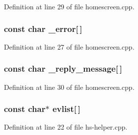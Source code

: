 Definition at line 29 of file homescreen.\+cpp.

\subsubsection[{\texorpdfstring{\+\_\+error}{_error}}]{\setlength{\rightskip}{0pt plus 5cm}const char \+\_\+error\mbox{[}$\,$\mbox{]}}\hypertarget{hs-helper_8h_aed1c5296a2e6d34945507a0fca17a376}{}\label{hs-helper_8h_aed1c5296a2e6d34945507a0fca17a376}


Definition at line 27 of file homescreen.\+cpp.

\subsubsection[{\texorpdfstring{\+\_\+reply\+\_\+message}{_reply_message}}]{\setlength{\rightskip}{0pt plus 5cm}const char \+\_\+reply\+\_\+message\mbox{[}$\,$\mbox{]}}\hypertarget{hs-helper_8h_a79b0f0b481161527ccb80e83da143219}{}\label{hs-helper_8h_a79b0f0b481161527ccb80e83da143219}


Definition at line 30 of file homescreen.\+cpp.

\subsubsection[{\texorpdfstring{evlist}{evlist}}]{\setlength{\rightskip}{0pt plus 5cm}const char$\ast$ evlist\mbox{[}$\,$\mbox{]}}\hypertarget{hs-helper_8h_a0cd84b1a2184c9b84d1b7bf24582f28e}{}\label{hs-helper_8h_a0cd84b1a2184c9b84d1b7bf24582f28e}


Definition at line 22 of file hs-\/helper.\+cpp.

